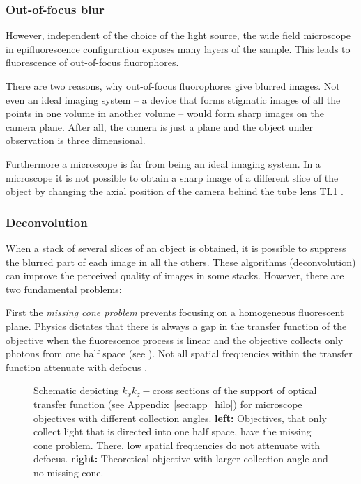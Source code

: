 \subsubsection{Out-of-focus blur}
However, independent of the choice of the light source, the wide field
microscope in epifluorescence configuration exposes many layers of the
sample. This leads to fluorescence of out-of-focus fluorophores.

There are two reasons, why out-of-focus fluorophores give blurred
images. Not even an ideal imaging system -- a device that forms
stigmatic images of all the points in one volume in another volume --
would form sharp images on the camera plane. After all, the camera is
just a plane and the object under observation is three dimensional.

Furthermore a microscope is far from being an ideal imaging system. In
a microscope it is not possible to obtain a sharp image of a different
slice of the object by changing the axial position of the camera
behind the tube lens TL1 \citep{Botcherby2007,Botcherby2008a}.
\subsubsection*{Deconvolution}
When a stack of several slices of an object is obtained, it is
possible to suppress the blurred part of each image in all the
others. These algorithms (deconvolution) can improve the perceived
quality of images in some stacks. However, there are two fundamental
problems:

First the \emph{missing cone problem} prevents focusing on a
homogeneous fluorescent plane. Physics dictates that there is always a
gap in the transfer function of the objective when the fluorescence
process is linear and the objective collects only photons from one
half space (see ). Not all spatial
frequencies within the transfer function attenuate with defocus
\citep{Neil1997}.

\begin{figure}[!hbt]
  \centering
  \caption{Schematic depicting $k_xk_z-$cross sections of the support
    of optical transfer function (see Appendix~\ref{sec:app_hilo}) for
    microscope objectives with different collection angles. {\bf
      left:} Objectives, that only collect light that is directed into
    one half space, have the missing cone problem. There, low spatial
    frequencies do not attenuate with defocus. {\bf right:} Theoretical
    objective with larger collection angle and no missing cone.}
  \label{fig:missing-cone}
\end{figure}

